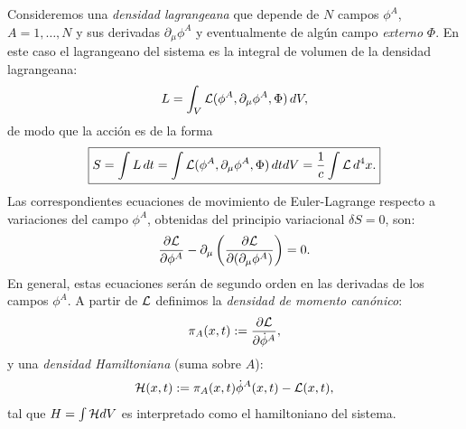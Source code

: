  Consideremos una \textit{densidad lagrangeana} que depende de $N$ campos $\phi^A$,
$A=1,\dots ,N$ y sus derivadas $\partial_\mu \phi^A$ y eventualmente de algún
campo {\em externo} $\Phi$. En este caso el lagrangeano del sistema es la
integral de volumen de la densidad lagrangeana:
\begin{equation}
L=\int_V {\cal L}(\phi^A,\partial_\mu\phi^A,\Phi)\, dV ,\label{lag4d}
\end{equation}
de modo que la acción es de la forma
\begin{equation}
\boxed{S=\int L\, dt= \int {\cal L}(\phi^A,\partial_\mu\phi^A,\Phi)\, dt dV=
\frac{1}{c}\int {\cal L}\,d^4x.}
\end{equation}
 Las correspondientes ecuaciones de movimiento de Euler-Lagrange respecto a variaciones del campo $\phi^A$, obtenidas del principio variacional $\delta S=0$, son:
\begin{equation}
\frac{\partial {\cal L}}{\partial \phi ^{A}}-\partial _{\mu }\left(
\frac{\partial {\cal L}}{\partial (\partial_{\mu }\phi^{A})}\right)=0.
\label{eccont2}
\end{equation}
En general, estas ecuaciones serán de segundo orden en las derivadas de los
campos $\phi^A$. A partir de $\cal L$ definimos la \textit{densidad de momento
canónico}:
\begin{equation}
\pi_A(x,t)  := \frac{\partial{\cal L}}{\partial\dot{\phi}^A},
\label{DensidadMomentoCanonicoConjugado}
\end{equation}
 y una \textit{densidad Hamiltoniana} (suma sobre $A$):
 \begin{equation}
{\cal H}(x,t) := \pi_A(x,t) \dot{\phi}^A(x,t)-{\cal L}(x,t) ,
\label{DensidadHamiltoniana}
\end{equation}
tal que $H=\int {\cal H}dV$ es interpretado como el hamiltoniano del sistema.


